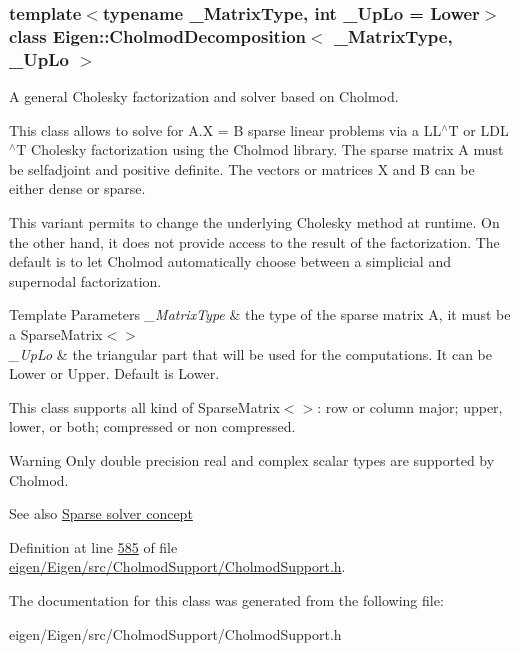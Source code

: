 \subsubsection*{template$<$typename \+\_\+\+Matrix\+Type, int \+\_\+\+Up\+Lo = Lower$>$\newline
class Eigen\+::\+Cholmod\+Decomposition$<$ \+\_\+\+Matrix\+Type, \+\_\+\+Up\+Lo $>$}

A general Cholesky factorization and solver based on Cholmod. 

This class allows to solve for A.\+X = B sparse linear problems via a L\+L$^\wedge$T or L\+D\+L$^\wedge$T Cholesky factorization using the Cholmod library. The sparse matrix A must be selfadjoint and positive definite. The vectors or matrices X and B can be either dense or sparse.

This variant permits to change the underlying Cholesky method at runtime. On the other hand, it does not provide access to the result of the factorization. The default is to let Cholmod automatically choose between a simplicial and supernodal factorization.


\begin{DoxyTemplParams}{Template Parameters}
{\em \+\_\+\+Matrix\+Type} & the type of the sparse matrix A, it must be a Sparse\+Matrix$<$$>$ \\
\hline
{\em \+\_\+\+Up\+Lo} & the triangular part that will be used for the computations. It can be Lower or Upper. Default is Lower.\\
\hline
\end{DoxyTemplParams}


This class supports all kind of Sparse\+Matrix$<$$>$\+: row or column major; upper, lower, or both; compressed or non compressed.

\begin{DoxyWarning}{Warning}
Only double precision real and complex scalar types are supported by Cholmod.
\end{DoxyWarning}
\begin{DoxySeeAlso}{See also}
\hyperlink{SparseLinearSystems.dox_TutorialSparseSolverConcept}{Sparse solver concept} 
\end{DoxySeeAlso}


Definition at line \hyperlink{eigen_2_eigen_2src_2_cholmod_support_2_cholmod_support_8h_source_l00585}{585} of file \hyperlink{eigen_2_eigen_2src_2_cholmod_support_2_cholmod_support_8h_source}{eigen/\+Eigen/src/\+Cholmod\+Support/\+Cholmod\+Support.\+h}.



The documentation for this class was generated from the following file\+:\begin{DoxyCompactItemize}
\item 
eigen/\+Eigen/src/\+Cholmod\+Support/\+Cholmod\+Support.\+h\end{DoxyCompactItemize}

